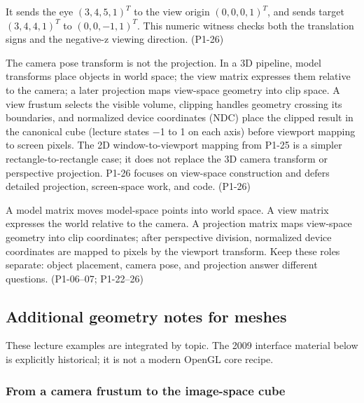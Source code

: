 It sends the eye \((3,4,5,1)^T\) to the view origin \((0,0,0,1)^T\), and sends target \((3,4,4,1)^T\) to \((0,0,-1,1)^T\). This numeric witness checks both the translation signs and the negative-z viewing direction. (P1-26)

The camera pose transform is not the projection. In a 3D pipeline, model transforms place objects in world space; the view matrix expresses them relative to the camera; a later projection maps view-space geometry into clip space. A view frustum selects the visible volume, clipping handles geometry crossing its boundaries, and normalized device coordinates (NDC) place the clipped result in the canonical cube (lecture states −1 to 1 on each axis) before viewport mapping to screen pixels. The 2D window-to-viewport mapping from P1-25 is a simpler rectangle-to-rectangle case; it does not replace the 3D camera transform or perspective projection. P1-26 focuses on view-space construction and defers detailed projection, screen-space work, and code. (P1-26)

A model matrix moves model-space points into world space. A view matrix expresses the world relative to the camera. A projection matrix maps view-space geometry into clip coordinates; after perspective division, normalized device coordinates are mapped to pixels by the viewport transform. Keep these roles separate: object placement, camera pose, and projection answer different questions. (P1-06--07; P1-22--26)

\subsection{Additional geometry notes for meshes}\label{03-visual-computing-i-ch003-additional-geometry-notes-for-meshes}

\hypertarget{03-visual-computing-i-ch003-additional-geometry-notes-for-meshes}{}

These lecture examples are integrated by topic. The 2009 interface material below is explicitly historical; it is not a modern OpenGL core recipe.

\subsubsection{From a camera frustum to the image-space cube}\label{03-visual-computing-i-ch003-from-a-camera-frustum-to-the-image-space-cube}

\hypertarget{03-visual-computing-i-ch003-from-a-camera-frustum-to-the-image-space-cube}{}

